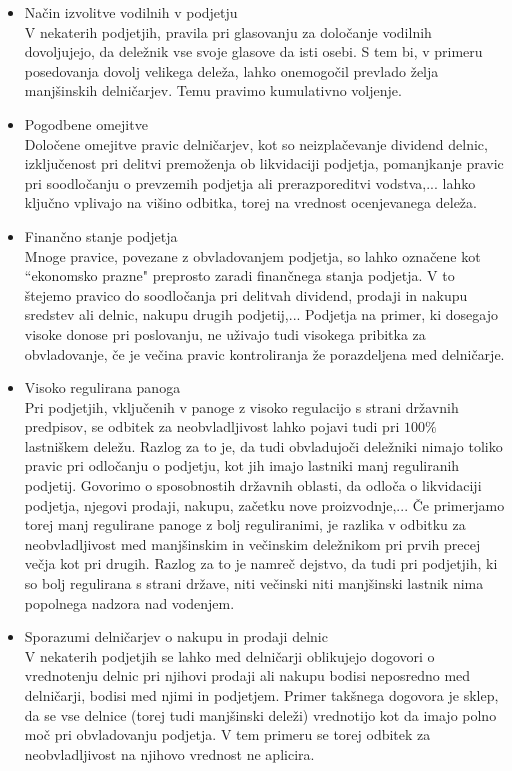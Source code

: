 \documentclass[12pt,a4paper]{amsart}
\theoremstyle{definition} %
\theoremstyle{plain} %
\begin{document}
\begin{itemize}
\item Način izvolitve vodilnih v podjetju\\
V nekaterih podjetjih, pravila pri glasovanju za določanje vodilnih dovoljujejo, da deležnik vse svoje glasove da isti osebi. S tem bi, v primeru posedovanja dovolj velikega deleža, lahko onemogočil prevlado želja manjšinskih delničarjev. Temu pravimo kumulativno voljenje.
\item Pogodbene omejitve\\
Določene omejitve pravic delničarjev, kot so neizplačevanje dividend delnic, izključenost pri delitvi premoženja ob likvidaciji podjetja, pomanjkanje pravic pri soodločanju o prevzemih podjetja ali prerazporeditvi vodstva,... lahko ključno vplivajo na višino odbitka, torej na vrednost ocenjevanega deleža.
\item Finančno stanje podjetja\\%
Mnoge pravice, povezane z obvladovanjem podjetja, so lahko označene kot ``ekonomsko prazne" preprosto zaradi finančnega stanja podjetja. V to štejemo pravico do soodločanja pri delitvah dividend, prodaji in nakupu sredstev ali delnic, nakupu drugih podjetij,... Podjetja na primer, ki dosegajo visoke donose pri poslovanju, ne uživajo tudi visokega pribitka za obvladovanje, če je večina pravic kontroliranja že porazdeljena med delničarje. 
\item Visoko regulirana panoga\\
Pri podjetjih, vključenih v panoge z visoko regulacijo s strani državnih predpisov, se odbitek za neobvladljivost lahko pojavi tudi pri $100\%$ lastniškem deležu. Razlog za to je, da tudi obvladujoči deležniki nimajo toliko pravic pri odločanju o podjetju, kot jih imajo lastniki manj reguliranih podjetij. Govorimo o sposobnostih državnih oblasti, da odloča o likvidaciji podjetja, njegovi prodaji, nakupu, začetku nove proizvodnje,... Če primerjamo torej manj regulirane panoge z bolj reguliranimi, je razlika v odbitku za neobvladljivost med manjšinskim in večinskim deležnikom pri prvih precej večja kot pri drugih. Razlog za to je namreč dejstvo, da tudi pri podjetjih, ki so bolj regulirana s strani države, niti večinski niti manjšinski lastnik nima popolnega nadzora nad vodenjem.
\item Sporazumi delničarjev o nakupu in prodaji delnic\\
V nekaterih podjetjih se lahko med delničarji oblikujejo dogovori o vrednotenju delnic pri njihovi prodaji ali nakupu bodisi neposredno med delničarji, bodisi med njimi in podjetjem. Primer takšnega dogovora je sklep, da se vse delnice (torej tudi manjšinski deleži) vrednotijo kot da imajo polno moč pri obvladovanju podjetja. V tem primeru se torej odbitek za neobvladljivost na njihovo vrednost ne aplicira.

\end{itemize}
\end{document}
